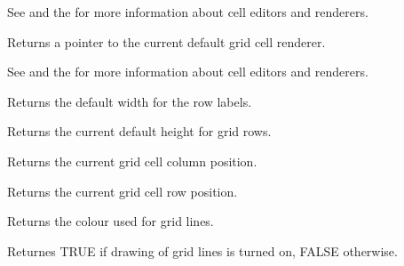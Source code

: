 See  and
the  for more information about cell editors and renderers.

\label{wxgridgetdefaultrenderer}


Returns a pointer to the current default grid cell renderer.

See  and
the  for more information about cell editors and renderers.

\label{wxgridgetdefaultrowlabelsize}


Returns the default width for the row labels.

\label{wxgridgetdefaultrowsize}


Returns the current default height for grid rows.

\label{wxgridgetgridcursorcol}


Returns the current grid cell column position.

\label{wxgridgetgridcursorrow}


Returns the current grid cell row position.

\label{wxgridgetgridlinecolour}


Returns the colour used for grid lines.

\label{wxgridgridlinesenabled}


Returnes TRUE if drawing of grid lines is turned on, FALSE otherwise.

\label{wxgridgetlabelbackgroundcolour}


